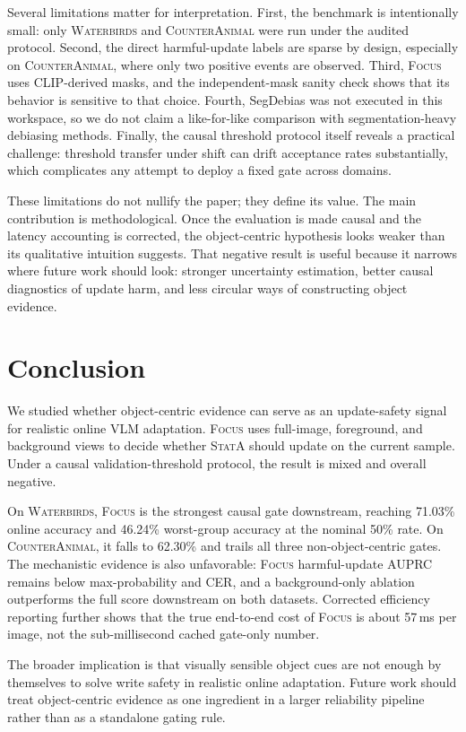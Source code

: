 \documentclass{article}
\newcommand{\focus}{\textsc{Focus}}
\newcommand{\stata}{\textsc{StatA}}
\newcommand{\wb}{\textsc{Waterbirds}}
\newcommand{\ca}{\textsc{CounterAnimal}}
\begin{document}
Several limitations matter for interpretation. First, the benchmark is intentionally small: only \wb{} and \ca{} were run under the audited protocol. Second, the direct harmful-update labels are sparse by design, especially on \ca{}, where only two positive events are observed. Third, \focus{} uses CLIP-derived masks, and the independent-mask sanity check shows that its behavior is sensitive to that choice. Fourth, SegDebias was not executed in this workspace, so we do not claim a like-for-like comparison with segmentation-heavy debiasing methods. Finally, the causal threshold protocol itself reveals a practical challenge: threshold transfer under shift can drift acceptance rates substantially, which complicates any attempt to deploy a fixed gate across domains.

These limitations do not nullify the paper; they define its value. The main contribution is methodological. Once the evaluation is made causal and the latency accounting is corrected, the object-centric hypothesis looks weaker than its qualitative intuition suggests. That negative result is useful because it narrows where future work should look: stronger uncertainty estimation, better causal diagnostics of update harm, and less circular ways of constructing object evidence.

\section{Conclusion}
\label{sec:conclusion}

We studied whether object-centric evidence can serve as an update-safety signal for realistic online VLM adaptation. \focus{} uses full-image, foreground, and background views to decide whether \stata{} should update on the current sample. Under a causal validation-threshold protocol, the result is mixed and overall negative.

On \wb{}, \focus{} is the strongest causal gate downstream, reaching 71.03\% online accuracy and 46.24\% worst-group accuracy at the nominal 50\% rate. On \ca{}, it falls to 62.30\% and trails all three non-object-centric gates. The mechanistic evidence is also unfavorable: \focus{} harmful-update AUPRC remains below max-probability and CER, and a background-only ablation outperforms the full score downstream on both datasets. Corrected efficiency reporting further shows that the true end-to-end cost of \focus{} is about 57\,ms per image, not the sub-millisecond cached gate-only number.

The broader implication is that visually sensible object cues are not enough by themselves to solve write safety in realistic online adaptation. Future work should treat object-centric evidence as one ingredient in a larger reliability pipeline rather than as a standalone gating rule.
\end{document}
